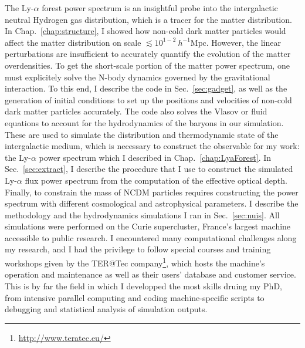 \begin{intro}
{\color{purple}T}he Ly-$\alpha$ forest power spectrum is an insightful probe into the intergalactic neutral Hydrogen gas distribution, which is a tracer for the matter distribution. In Chap.~\ref{chap:structure}, I showed how non-cold dark matter particles would affect the matter distribution on scale $\lesssim 10^{1-2}~h^{-1}\mathrm{Mpc}$. However, the linear perturbations are insufficient to accurately quantify the evolution of the matter overdensities. To get the short-scale portion of the matter power spectrum, one must explicitely solve the N-body dynamics governed by the gravitational interaction. To this end, I describe the code in Sec.~\ref{sec:gadget}, as well as the generation of initial conditions to set up the positions and velocities of non-cold dark matter particles accurately. The code also solves the Vlasov or fluid equations to account for the hydrodynamics of the baryons in our simulation. These are used to simulate the distribution and thermodynamic state of the intergalactic medium, which is necessary to construct the observable for my work: the Ly-$\alpha$ power spectrum which I described in Chap.~\ref{chap:LyaForest}. In Sec.~\ref{sec:extract}, I describe the procedure that I use to construct the simulated Ly-$\alpha$ flux power spectrum from the computation of the effective optical depth. Finally, to constrain the mass of NCDM particles requires constructing the power spectrum with different cosmological and astrophysical parameters. I describe the methodology and the hydrodynamics simulations I ran in Sec.~\ref{sec:nuis}. All simulations were performed on the \textsf{Curie} supercluster, France's largest machine accessible to public research. I encountered many computational challenges along my research, and I had the privilege to follow special courses and training workshops given by the \textsf{TER@Tec} company\footnote{\url{http://www.teratec.eu/}}, which hosts the machine's operation and maintenance as well as their users' database and customer service. This is by far the field in which I developped the most skills druing my PhD, from intensive parallel computing and coding machine-specific scripts to debugging and statistical analysis of simulation outputs.
\end{intro}